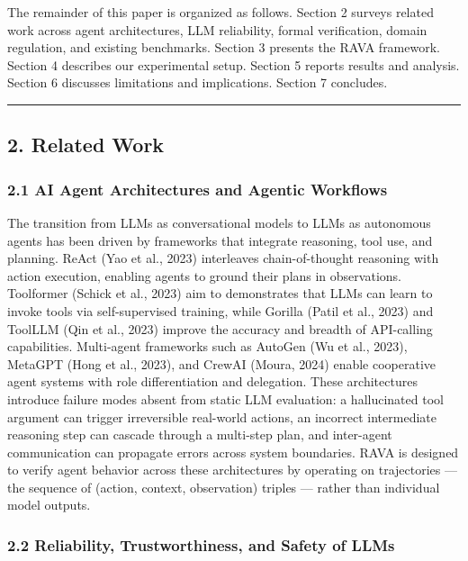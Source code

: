 \documentclass[
]{article}
\begin{document}
The remainder of this paper is organized as follows. Section 2 surveys related work across agent architectures, LLM reliability, formal verification, domain regulation, and existing benchmarks. Section 3 presents the RAVA framework. Section 4 describes our experimental setup. Section 5 reports results and analysis. Section 6 discusses limitations and implications. Section 7 concludes.

\begin{center}\rule{0.5\linewidth}{0.5pt}\end{center}

\hypertarget{2-related-work}{%
\subsection{2. Related Work}\label{2-related-work}}

\hypertarget{21-ai-agent-architectures-and-agentic-workflows}{%
\subsubsection{2.1 AI Agent Architectures and Agentic Workflows}\label{21-ai-agent-architectures-and-agentic-workflows}}

The transition from LLMs as conversational models to LLMs as autonomous agents has been driven by frameworks that integrate reasoning, tool use, and planning. ReAct (Yao et al., 2023) interleaves chain-of-thought reasoning with action execution, enabling agents to ground their plans in observations. Toolformer (Schick et al., 2023) aim to demonstrates that LLMs can learn to invoke tools via self-supervised training, while Gorilla (Patil et al., 2023) and ToolLLM (Qin et al., 2023) improve the accuracy and breadth of API-calling capabilities. Multi-agent frameworks such as AutoGen (Wu et al., 2023), MetaGPT (Hong et al., 2023), and CrewAI (Moura, 2024) enable cooperative agent systems with role differentiation and delegation. These architectures introduce failure modes absent from static LLM evaluation: a hallucinated tool argument can trigger irreversible real-world actions, an incorrect intermediate reasoning step can cascade through a multi-step plan, and inter-agent communication can propagate errors across system boundaries. RAVA is designed to verify agent behavior across these architectures by operating on trajectories --- the sequence of (action, context, observation) triples --- rather than individual model outputs.

\hypertarget{22-reliability-trustworthiness-and-safety-of-llms}{%
\subsubsection{2.2 Reliability, Trustworthiness, and Safety of LLMs}\label{22-reliability-trustworthiness-and-safety-of-llms}}
\end{document}
